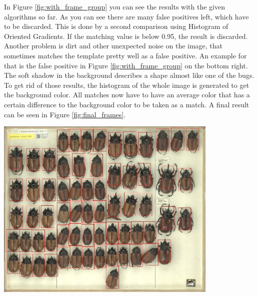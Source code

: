 In Figure \ref{fig:with_frame_group} you can see the results with the given algorithms so far.
As you can see there are many false positives left, which have to be discarded.
This is done by a second comparison using Histogram of Oriented Gradients.
If the matching value is below 0.95, the result is discarded.
Another problem is dirt and other unexpected noise on the image, that sometimes matches the template pretty well as a false positive.
An example for that is the false positive in Figure \ref{fig:with_frame_group} on the bottom right.
The soft shadow in the background describes a shape almost like one of the bugs.
To get rid of those results, the histogram of the whole image is generated to get the background color.
All matches now have to have an average color that has a certain difference to the background color to be taken as a match.
A final result can be seen in Figure \ref{fig:final_frames}.
\begin{center}
	\includegraphics[width=0.8\textwidth]{images/final_frames.jpg}
	\label{fig:final_frames}
\end{center}


